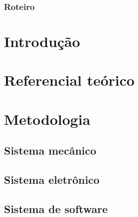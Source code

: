 \documentclass{beamer}
\begin{document}
\begin{frame}
\titlepage
\end{frame}

\begin{frame}
\frametitle{Roteiro}
\tableofcontents[currentsection, hideothersubsections, sectionstyle=show/show]
\end{frame}

\section{Introdução}






\section{Referencial teórico}





\section{Metodologia}

\subsection{Sistema mecânico}




%
    
\subsection{Sistema eletrônico}











\subsection{Sistema de software}





\end{document}
